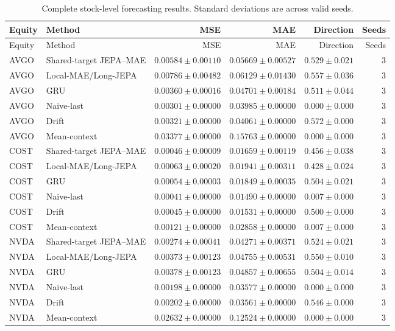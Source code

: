 \begin{longtable}{llrrrr}
\caption{Complete stock-level forecasting results. Standard deviations are across valid seeds.}\label{tab:appendix_stock_metrics}\\
\toprule
Equity & Method & MSE & MAE & Direction & Seeds \\
\midrule
\endfirsthead
\toprule
Equity & Method & MSE & MAE & Direction & Seeds \\
\midrule
\endhead
AVGO & Shared-target JEPA--MAE & $0.00584 \pm 0.00110$ & $0.05669 \pm 0.00527$ & $0.529 \pm 0.021$ & 3 \\
AVGO & Local-MAE/Long-JEPA & $0.00786 \pm 0.00482$ & $0.06129 \pm 0.01430$ & $0.557 \pm 0.036$ & 3 \\
AVGO & GRU & $0.00360 \pm 0.00016$ & $0.04701 \pm 0.00184$ & $0.511 \pm 0.044$ & 3 \\
AVGO & Naive-last & $0.00301 \pm 0.00000$ & $0.03985 \pm 0.00000$ & $0.000 \pm 0.000$ & 3 \\
AVGO & Drift & $0.00321 \pm 0.00000$ & $0.04061 \pm 0.00000$ & $0.572 \pm 0.000$ & 3 \\
AVGO & Mean-context & $0.03377 \pm 0.00000$ & $0.15763 \pm 0.00000$ & $0.000 \pm 0.000$ & 3 \\
COST & Shared-target JEPA--MAE & $0.00046 \pm 0.00009$ & $0.01659 \pm 0.00119$ & $0.456 \pm 0.038$ & 3 \\
COST & Local-MAE/Long-JEPA & $0.00063 \pm 0.00020$ & $0.01941 \pm 0.00311$ & $0.428 \pm 0.024$ & 3 \\
COST & GRU & $0.00054 \pm 0.00003$ & $0.01849 \pm 0.00035$ & $0.504 \pm 0.021$ & 3 \\
COST & Naive-last & $0.00041 \pm 0.00000$ & $0.01490 \pm 0.00000$ & $0.007 \pm 0.000$ & 3 \\
COST & Drift & $0.00045 \pm 0.00000$ & $0.01531 \pm 0.00000$ & $0.500 \pm 0.000$ & 3 \\
COST & Mean-context & $0.00121 \pm 0.00000$ & $0.02858 \pm 0.00000$ & $0.007 \pm 0.000$ & 3 \\
NVDA & Shared-target JEPA--MAE & $0.00274 \pm 0.00041$ & $0.04271 \pm 0.00371$ & $0.524 \pm 0.021$ & 3 \\
NVDA & Local-MAE/Long-JEPA & $0.00373 \pm 0.00123$ & $0.04755 \pm 0.00531$ & $0.550 \pm 0.010$ & 3 \\
NVDA & GRU & $0.00378 \pm 0.00123$ & $0.04857 \pm 0.00655$ & $0.504 \pm 0.014$ & 3 \\
NVDA & Naive-last & $0.00198 \pm 0.00000$ & $0.03577 \pm 0.00000$ & $0.000 \pm 0.000$ & 3 \\
NVDA & Drift & $0.00202 \pm 0.00000$ & $0.03561 \pm 0.00000$ & $0.546 \pm 0.000$ & 3 \\
NVDA & Mean-context & $0.02632 \pm 0.00000$ & $0.12524 \pm 0.00000$ & $0.000 \pm 0.000$ & 3 \\
\bottomrule
\end{longtable}
